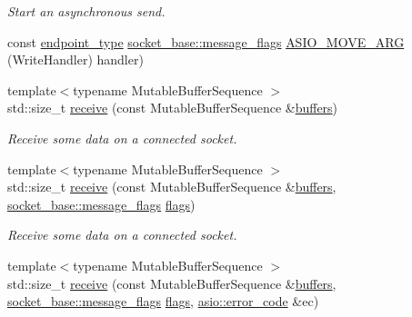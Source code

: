 \begin{DoxyCompactItemize}
\begin{DoxyCompactList}\small\item\em Start an asynchronous send. \end{DoxyCompactList}\item 
const \hyperlink{classasio_1_1basic__raw__socket_a75803815223ab2cbfa66c51a650236b5}{endpoint\+\_\+type} \hyperlink{classasio_1_1socket__base_ac3cf77465dfedfe1979b5415cf32cc94}{socket\+\_\+base\+::message\+\_\+flags} \hyperlink{classasio_1_1basic__raw__socket_a2eb67801ec225ef624f321b2bcd9f1f0}{A\+S\+I\+O\+\_\+\+M\+O\+V\+E\+\_\+\+A\+R\+G} (Write\+Handler) handler)
\item 
{\footnotesize template$<$typename Mutable\+Buffer\+Sequence $>$ }\\std\+::size\+\_\+t \hyperlink{classasio_1_1basic__raw__socket_ae77238152d4bc2ee62b6ffae5e65d042}{receive} (const Mutable\+Buffer\+Sequence \&\hyperlink{group__async__read_ga54dede45c3175148a77fe6635222c47d}{buffers})
\begin{DoxyCompactList}\small\item\em Receive some data on a connected socket. \end{DoxyCompactList}\item 
{\footnotesize template$<$typename Mutable\+Buffer\+Sequence $>$ }\\std\+::size\+\_\+t \hyperlink{classasio_1_1basic__raw__socket_a1154a6df2008df5a3aea7d97113611c7}{receive} (const Mutable\+Buffer\+Sequence \&\hyperlink{group__async__read_ga54dede45c3175148a77fe6635222c47d}{buffers}, \hyperlink{classasio_1_1socket__base_ac3cf77465dfedfe1979b5415cf32cc94}{socket\+\_\+base\+::message\+\_\+flags} \hyperlink{classasio_1_1basic__raw__socket_a324289af06e6526b244c1074db009c3f}{flags})
\begin{DoxyCompactList}\small\item\em Receive some data on a connected socket. \end{DoxyCompactList}\item 
{\footnotesize template$<$typename Mutable\+Buffer\+Sequence $>$ }\\std\+::size\+\_\+t \hyperlink{classasio_1_1basic__raw__socket_a360cbf81c44fe2b1dfb46479427a9db1}{receive} (const Mutable\+Buffer\+Sequence \&\hyperlink{group__async__read_ga54dede45c3175148a77fe6635222c47d}{buffers}, \hyperlink{classasio_1_1socket__base_ac3cf77465dfedfe1979b5415cf32cc94}{socket\+\_\+base\+::message\+\_\+flags} \hyperlink{classasio_1_1basic__raw__socket_a324289af06e6526b244c1074db009c3f}{flags}, \hyperlink{classasio_1_1error__code}{asio\+::error\+\_\+code} \&ec)

\end{DoxyCompactItemize}
